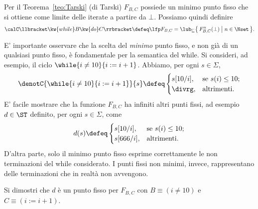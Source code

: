 Per il Teorema~\ref{teo:Tarski} (di Tarski)
$F_{B,C}$ possiede un minimo punto fisso che si ottiene come
limite delle iterate a partire da $\bot$.
Possiamo quindi definire
\[
  \calC \llbracket \kw{while} B \kw{do} C \rrbracket
    \defeq \lfp F_{B,C}
    = \lub_{\sqsubseteq} \bigl\{\, F_{B,C}^n(\bot) \bigm| n \in \Nset \,\bigr\}.
\]

E' importante osservare che la scelta del \emph{minimo} punto fisso,
e non gi\`a di un qualsiasi punto fisso, \`e fondamentale
per la semantica del while.
Si consideri, ad esempio, il ciclo $\while{i \neq 10}{i := i+1}$.
Abbiamo, per ogni $s \in \Sigma$,
\[
  \denotC{\while{i \neq 10}{i := i+1}}{s}
    \defeq
      \begin{cases}
        s[10/i], &\text{se $s(i) \leq 10$;} \\
        \divrg, &\text{altrimenti.}
      \end{cases}
\]
E' facile mostrare che la funzione $F_{B,C}$ ha infiniti altri punti fissi,
ad esempio $d \in \ST$ definito, per ogni $s \in \Sigma$, come
\begin{align}
  d(s)
    \defeq
      \begin{cases}
        s[10/i], &\text{se $s(i) \leq 10$;} \\
        s[666/i], &\text{altrimenti.}
      \end{cases}
\end{align}
D'altra parte, solo il minimo punto fisso esprime correttamente
le non terminazioni del while considerato.
I punti fissi non minimi, invece, rappresentano delle terminazioni
che in realt\`a non avvengono.

\begin{esercizio}
Si dimostri che $d$ \`e un punto fisso per $F_{B,C}$
con $B \equiv (i \neq 10)$ e $C \equiv (i := i+1)$.
\end{esercizio}
